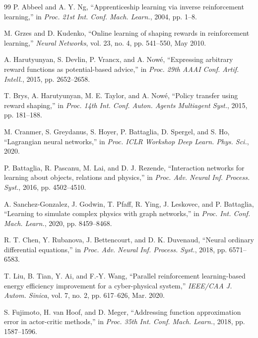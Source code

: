 \documentclass[journal]{IEEEtran}
\begin{document}
\begin{thebibliography}{99}
		P. Abbeel and A. Y. Ng, ``Apprenticeship learning via inverse reinforcement learning,'' in \textit{Proc. 21st Int. Conf. Mach. Learn.}, 2004, pp. 1--8.
		
		M. Grzes and D. Kudenko, ``Online learning of shaping rewards in reinforcement learning,'' \textit{Neural Networks}, vol. 23, no. 4, pp. 541--550, May 2010.
		
		A. Harutyunyan, S. Devlin, P. Vrancx, and A. Nowé, ``Expressing arbitrary reward functions as potential-based advice,'' in \textit{Proc. 29th AAAI Conf. Artif. Intell.}, 2015, pp. 2652--2658.
		
		T. Brys, A. Harutyunyan, M. E. Taylor, and A. Nowé, ``Policy transfer using reward shaping,'' in \textit{Proc. 14th Int. Conf. Auton. Agents Multiagent Syst.}, 2015, pp. 181--188.
		
		M. Cranmer, S. Greydanus, S. Hoyer, P. Battaglia, D. Spergel, and S. Ho, ``Lagrangian neural networks,'' in \textit{Proc. ICLR Workshop Deep Learn. Phys. Sci.}, 2020.
		
		P. Battaglia, R. Pascanu, M. Lai, and D. J. Rezende, ``Interaction networks for learning about objects, relations and physics,'' in \textit{Proc. Adv. Neural Inf. Process. Syst.}, 2016, pp. 4502--4510.
		
		A. Sanchez-Gonzalez, J. Godwin, T. Pfaff, R. Ying, J. Leskovec, and P. Battaglia, ``Learning to simulate complex physics with graph networks,'' in \textit{Proc. Int. Conf. Mach. Learn.}, 2020, pp. 8459--8468.
		
		R. T. Chen, Y. Rubanova, J. Bettencourt, and D. K. Duvenaud, ``Neural ordinary differential equations,'' in \textit{Proc. Adv. Neural Inf. Process. Syst.}, 2018, pp. 6571--6583.
		
		T. Liu, B. Tian, Y. Ai, and F.-Y. Wang, ``Parallel reinforcement learning-based energy efficiency improvement for a cyber-physical system,'' \textit{IEEE/CAA J. Autom. Sinica}, vol. 7, no. 2, pp. 617--626, Mar. 2020.
		
		S. Fujimoto, H. van Hoof, and D. Meger, ``Addressing function approximation error in actor-critic methods,'' in \textit{Proc. 35th Int. Conf. Mach. Learn.}, 2018, pp. 1587--1596.
		

\end{thebibliography}
\end{document}
